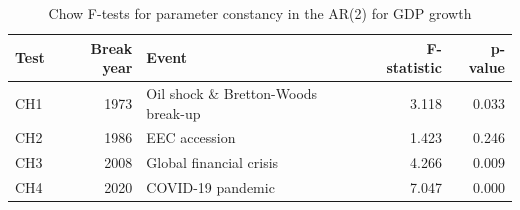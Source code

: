 \begin{table}

\caption{\label{tab:chow-tests}Chow F-tests for parameter constancy in the AR(2) for GDP growth}
\centering
\begin{tabular}[t]{lrlrr}
\toprule
Test & Break year & Event & F-statistic & p-value\\
\midrule
CH1 & 1973 & Oil shock \& Bretton-Woods break-up & 3.118 & 0.033\\
CH2 & 1986 & EEC accession & 1.423 & 0.246\\
CH3 & 2008 & Global financial crisis & 4.266 & 0.009\\
CH4 & 2020 & COVID-19 pandemic & 7.047 & 0.000\\
\bottomrule
\end{tabular}
\end{table}
